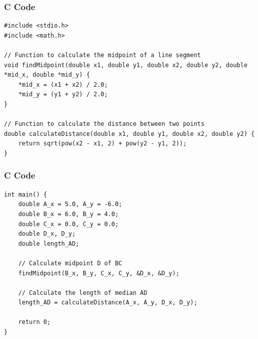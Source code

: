 \documentclass{beamer}
\begin{document}
\begin{frame}[fragile]
\frametitle{C Code}
\begin{lstlisting}
#include <stdio.h>
#include <math.h>

// Function to calculate the midpoint of a line segment
void findMidpoint(double x1, double y1, double x2, double y2, double *mid_x, double *mid_y) {
    *mid_x = (x1 + x2) / 2.0;
    *mid_y = (y1 + y2) / 2.0;
}

// Function to calculate the distance between two points
double calculateDistance(double x1, double y1, double x2, double y2) {
    return sqrt(pow(x2 - x1, 2) + pow(y2 - y1, 2));
}
\end{lstlisting}
\end{frame}
\begin{frame}[fragile]
\frametitle{C Code }
\begin{lstlisting}
int main() {
    double A_x = 5.0, A_y = -6.0;
    double B_x = 6.0, B_y = 4.0;
    double C_x = 0.0, C_y = 0.0;
    double D_x, D_y;
    double length_AD;

    // Calculate midpoint D of BC
    findMidpoint(B_x, B_y, C_x, C_y, &D_x, &D_y);

    // Calculate the length of median AD
    length_AD = calculateDistance(A_x, A_y, D_x, D_y);

    return 0;
}

\end{lstlisting}
\end{frame}
\end{document}
